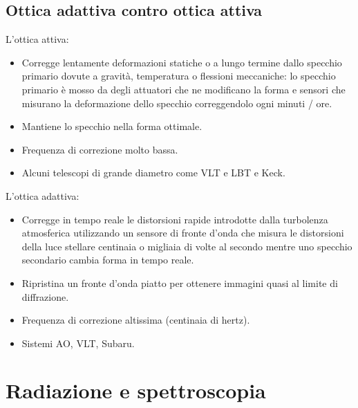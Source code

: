 \documentclass[a4paper, oneside]{book}
\begin{document}
\section{Ottica adattiva contro ottica attiva}
L'ottica attiva: 
\begin{itemize}
    \item Corregge lentamente deformazioni statiche o a lungo termine dallo specchio primario
    dovute a gravità, temperatura o flessioni meccaniche: lo specchio primario è mosso 
    da degli attuatori che ne modificano la forma e sensori che misurano la deformazione dello specchio
    correggendolo ogni minuti / ore. 
    \item Mantiene lo specchio nella forma ottimale.
    \item Frequenza di correzione molto bassa. 
    \item Alcuni telescopi di grande diametro come VLT e LBT e Keck. 
\end{itemize}
L'ottica adattiva: 
\begin{itemize}
    \item Corregge in tempo reale le distorsioni rapide introdotte dalla turbolenza 
    atmosferica utilizzando un sensore di fronte d'onda che misura le distorsioni della luce stellare 
    centinaia o migliaia di volte al secondo mentre uno specchio secondario cambia forma 
    in tempo reale. 
    \item Ripristina un fronte d'onda piatto per ottenere immagini quasi al limite di diffrazione. 
    \item Frequenza di correzione altissima (centinaia di hertz). 
    \item Sistemi AO, VLT, Subaru. 
\end{itemize}



\chapter{Radiazione e spettroscopia}
\end{document}
